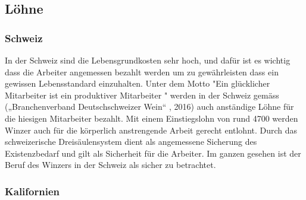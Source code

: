 \subsection{Löhne}
\subsubsection{Schweiz}
In der Schweiz sind die Lebensgrundkosten sehr hoch, und dafür ist es wichtig dass die Arbeiter angemessen bezahlt werden um zu gewährleisten dass ein gewissen Lebensstandard einzuhalten. Unter dem Motto "Ein glücklicher Mitarbeiter ist ein produktiver Mitarbeiter " werden in der Schweiz gemäss
(„Branchenverband Deutschschweizer Wein“ , 2016) auch anständige Löhne für die hiesigen Mitarbeiter bezahlt. Mit einem Einstiegslohn von rund 4700 werden Winzer auch für die körperlich anstrengende Arbeit gerecht entlohnt. Durch das schweizerische Dreisäulensystem dient als angemessene Sicherung des Existenzbedarf und gilt als Sicherheit für die Arbeiter. Im ganzen gesehen ist der Beruf des Winzers in der Schweiz als sicher zu betrachtet.

\subsubsection{Kalifornien}

